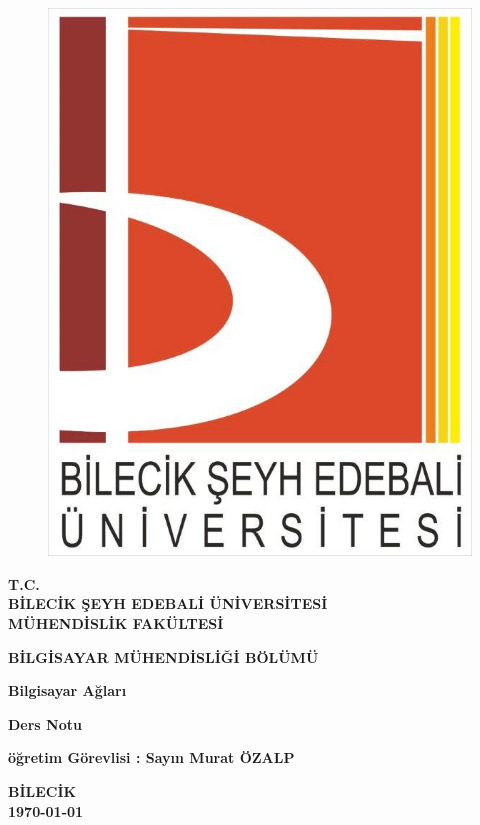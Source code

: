 \thispagestyle{empty} 
\begin{figure}[H]
\centering
\includegraphics[scale=0.2]{logomuz}
\end{figure}
\begin{center}
\textbf{T.C.}\\
\textbf{BİLECİK ŞEYH EDEBALİ ÜNİVERSİTESİ}\\
\textbf{MÜHENDİSLİK FAKÜLTESİ}

\textbf{BİLGİSAYAR MÜHENDİSLİĞİ BÖLÜMÜ}
\end{center}

\vspace*{4cm}
\begin{center}
\textbf{Bilgisayar Ağları}


\textbf{Ders Notu}
\end{center}

\vspace*{\fill}
\begin{center}
\textbf{öğretim Görevlisi : Sayın Murat ÖZALP}

\textbf{BİLECİK}\\ 
\textbf{\today}
\end{center}
